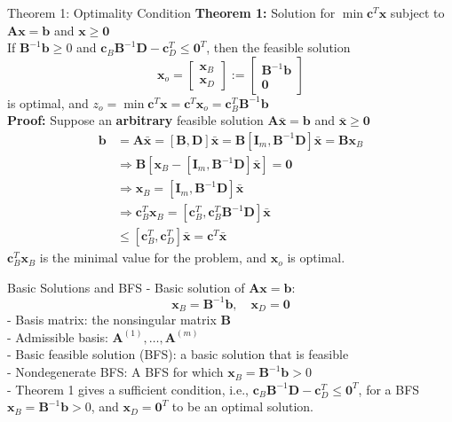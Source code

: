 \documentclass[aspectratio=169,hyperref,UTF8,CJK]{beamer}
\begin{document}
\begin{frame}{Theorem 1: Optimality Condition}
\textbf{Theorem 1:} Solution for \(\min \mathbf{c}^T\mathbf{x}\) subject to \(\mathbf{A}\mathbf{x} = \mathbf{b}\) and \(\mathbf{x} \geq \mathbf{0}\) \\
If \(\mathbf{B}^{-1}\mathbf{b} \geq 0\) and \(\mathbf{c}_B\mathbf{B}^{-1}\mathbf{D} - \mathbf{c}_D^T \leq \mathbf{0}^T\), then the feasible solution
\[
\mathbf{x}_o = \begin{bmatrix} \mathbf{x}_B \\ \mathbf{x}_D \end{bmatrix} := \begin{bmatrix} \mathbf{B}^{-1}\mathbf{b} \\ \mathbf{0} \end{bmatrix}
\]
is optimal, and \(z_o = \min \mathbf{c}^T\mathbf{x} = \mathbf{c}^T\mathbf{x}_o = \mathbf{c}_B^T\mathbf{B}^{-1}\mathbf{b}\) \\
\textbf{Proof:} Suppose an \textbf{arbitrary} feasible solution \(\mathbf{A}\bar{\mathbf{x}} = \mathbf{b}\) and \(\bar{\mathbf{x}} \geq \mathbf{0}\)
\begin{align*}
\mathbf{b} &= \mathbf{A}\bar{\mathbf{x}} = [\mathbf{B},\mathbf{D}]\bar{\mathbf{x}} = \mathbf{B}[\mathbf{I}_m,\mathbf{B}^{-1}\mathbf{D}]\bar{\mathbf{x}} = \mathbf{B}\mathbf{x}_B \\
&\Rightarrow \mathbf{B}[\mathbf{x}_B - [\mathbf{I}_m,\mathbf{B}^{-1}\mathbf{D}]\bar{\mathbf{x}}] = \mathbf{0} \\
&\Rightarrow \mathbf{x}_B = [\mathbf{I}_m,\mathbf{B}^{-1}\mathbf{D}]\bar{\mathbf{x}} \\
&\Rightarrow \mathbf{c}_B^T\mathbf{x}_B = [\mathbf{c}_B^T,\mathbf{c}_B^T\mathbf{B}^{-1}\mathbf{D}]\bar{\mathbf{x}} \\
&\leq [\mathbf{c}_B^T,\mathbf{c}_D^T]\bar{\mathbf{x}} = \mathbf{c}^T\bar{\mathbf{x}}
\end{align*}
\(\mathbf{c}_B^T\mathbf{x}_B\) is the minimal value for the problem, and \(\mathbf{x}_o\) is optimal.
\end{frame}

\begin{frame}{Basic Solutions and BFS}
- Basic solution of \(\mathbf{A}\mathbf{x} = \mathbf{b}\):
\[
\mathbf{x}_B = \mathbf{B}^{-1}\mathbf{b}, \quad \mathbf{x}_D = \mathbf{0}
\]
- Basis matrix: the nonsingular matrix \(\mathbf{B}\) \\
- Admissible basis: \(\mathbf{A}^{(1)},\ldots ,\mathbf{A}^{(m)}\) \\
- Basic feasible solution (BFS): a basic solution that is feasible \\
- Nondegenerate BFS: A BFS for which \(\mathbf{x}_B = \mathbf{B}^{-1}\mathbf{b} > 0\) \\
- Theorem 1 gives a sufficient condition, i.e., \(\mathbf{c}_B\mathbf{B}^{-1}\mathbf{D} - \mathbf{c}_D^T \leq \mathbf{0}^T\), for a BFS \(\mathbf{x}_B = \mathbf{B}^{-1}\mathbf{b} > 0\), and \(\mathbf{x}_D = \mathbf{0}^T\) to be an optimal solution.
\end{frame}
\end{document}
